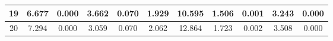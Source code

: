 \begin{table}[]
\begin{tabular}{|c|cc|cc|cc|cc|cc|}
19 & 6.677 & \cellcolor[HTML]{EFEFEF}0.000 & 3.662 & \cellcolor[HTML]{EFEFEF}0.070 & 1.929 & \cellcolor[HTML]{EFEFEF}10.595 & 1.506 & \cellcolor[HTML]{EFEFEF}0.001 & 3.243 & \cellcolor[HTML]{EFEFEF}0.000 \\ \hline
20 & 7.294 & \cellcolor[HTML]{EFEFEF}0.000 & 3.059 & \cellcolor[HTML]{EFEFEF}0.070 & 2.062 & \cellcolor[HTML]{EFEFEF}12.864 & 1.723 & \cellcolor[HTML]{EFEFEF}0.002 & 3.508 & \cellcolor[HTML]{EFEFEF}0.000 \\ \hline
\end{tabular}
\end{table}
